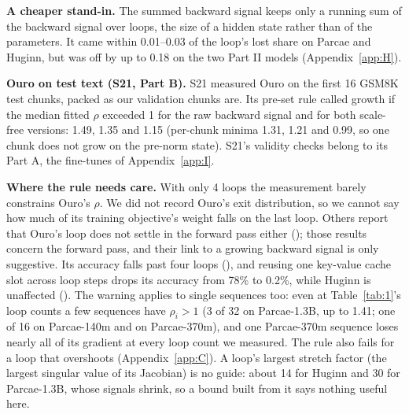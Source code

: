 \documentclass[10pt]{article}
\begin{document}
\textbf{A cheaper stand-in.} The summed backward signal keeps only a running sum of the backward signal over loops, the size of a hidden state rather than of the parameters. It came within 0.01--0.03 of the loop's lost share on Parcae and Huginn, but was off by up to 0.18 on the two Part II models (Appendix~\ref{app:H}).

\textbf{Ouro on test text (S21, Part B).} S21 measured Ouro on the first 16 GSM8K test chunks, packed as our validation chunks are. Its pre-set rule called growth if the median fitted $\rho$ exceeded 1 for the raw backward signal and for both scale-free versions: 1.49, 1.35 and 1.15 (per-chunk minima 1.31, 1.21 and 0.99, so one chunk does not grow on the pre-norm state). S21's validity checks belong to its Part A, the fine-tunes of Appendix~\ref{app:I}.

\textbf{Where the rule needs care.} With only 4 loops the measurement barely constrains Ouro's $\rho$. We did not record Ouro's exit distribution, so we cannot say how much of its training objective's weight falls on the last loop. Others report that Ouro's loop does not settle in the forward pass either (\citealp[Sec.~1]{huang2026partii}); those results concern the forward pass, and their link to a growing backward signal is only suggestive. Its accuracy falls past four loops (\citealp{yang2026stars}), and reusing one key-value cache slot across loop steps drops its accuracy from 78\% to 0.2\%, while Huginn is unaffected (\citealp[Table 4]{schwethelm2026b}). The warning applies to single sequences too: even at Table~\ref{tab:1}'s loop counts a few sequences have $\rho_i > 1$ (3 of 32 on Parcae-1.3B, up to 1.41; one of 16 on Parcae-140m and on Parcae-370m), and one Parcae-370m sequence loses nearly all of its gradient at every loop count we measured. The rule also fails for a loop that overshoots (Appendix~\ref{app:C}). A loop's largest stretch factor (the largest singular value of its Jacobian) is no guide: about 14 for Huginn and 30 for Parcae-1.3B, whose signals shrink, so a bound built from it says nothing useful here.
\end{document}
